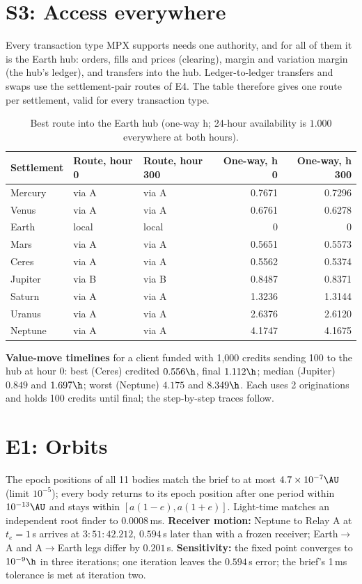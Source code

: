 \section{S3: Access everywhere}\label{app:s3}
Every transaction type MPX supports needs one authority, and for all of them it is the Earth hub: orders, fills and prices (clearing), margin and variation margin (the hub's ledger), and transfers into the hub. Ledger-to-ledger transfers and swaps use the settlement-pair routes of E4. The table therefore gives one route per settlement, valid for every transaction type.
\begin{table}[H]
\centering
\caption{Best route into the Earth hub (one-way h; 24-hour availability is $1.000$ everywhere at both hours).}
\small
\begin{tabular}{@{}lllrr@{}}
\toprule
Settlement & Route, hour 0 & Route, hour 300 & One-way, h 0 & One-way, h 300 \\
\midrule
Mercury & via A & via A & 0.7671 & 0.7296 \\
Venus & via A & via A & 0.6761 & 0.6278 \\
Earth & local & local & 0 & 0 \\
Mars & via A & via A & 0.5651 & 0.5573 \\
Ceres & via A & via A & 0.5562 & 0.5374 \\
Jupiter & via B & via B & 0.8487 & 0.8371 \\
Saturn & via A & via A & 1.3236 & 1.3144 \\
Uranus & via A & via A & 2.6376 & 2.6120 \\
Neptune & via A & via A & 4.1747 & 4.1675 \\
\bottomrule
\end{tabular}
\end{table}
\textbf{Value-move timelines} for a client funded with 1{,}000 credits sending 100 to the hub at hour 0: best (Ceres) credited $0.556\h$, final $1.112\h$; median (Jupiter) $0.849$ and $1.697\h$; worst (Neptune) $4.175$ and $8.349\h$. Each uses 2 originations and holds 100 credits until final; the step-by-step traces follow.



\section{E1: Orbits}\label{app:e1}
The epoch positions of all 11 bodies match the brief to at most $4.7\times10^{-7}\AU$ (limit $10^{-5}$); every body returns to its epoch position after one period within $10^{-13}\AU$ and stays within $[a(1-e),a(1+e)]$. Light-time matches an independent root finder to $0.0008$\,ms. \textbf{Receiver motion:} Neptune to Relay A at $t_e=1\,$s arrives at $3{:}51{:}42.212$, $0.594$\,s later than with a frozen receiver; Earth$\to$A and A$\to$Earth legs differ by $0.201$\,s. \textbf{Sensitivity:} the fixed point converges to $10^{-9}\h$ in three iterations; one iteration leaves the $0.594$\,s error; the brief's 1\,ms tolerance is met at iteration two.

